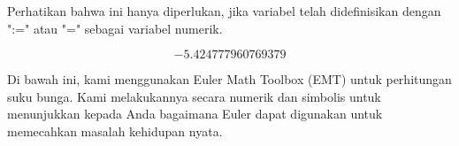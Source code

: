 \documentclass[a4paper,10pt]{article}
\begin{document}
\begin{eulernotebook}
\begin{eulercomment}
\begin{eulercomment}
\begin{eulercomment}
\begin{eulercomment}
\begin{eulercomment}
\begin{eulercomment}
\begin{eulercomment}
\begin{eulercomment}
\begin{eulercomment}
Perhatikan bahwa ini hanya diperlukan, jika variabel telah
didefinisikan dengan ":=" atau "=" sebagai variabel numerik.
\end{eulercomment}
\begin{eulerformula}
\[
-5.424777960769379
\]
\end{eulerformula}
\begin{eulercomment}
\begin{eulercomment}
\begin{eulercomment}
Di bawah ini, kami menggunakan Euler Math Toolbox (EMT) untuk
perhitungan suku bunga. Kami melakukannya secara numerik dan simbolis
untuk menunjukkan kepada Anda bagaimana Euler dapat digunakan untuk
memecahkan masalah kehidupan nyata.


\end{eulercomment}
\end{eulercomment}
\end{eulercomment}
\end{eulercomment}
\end{eulercomment}
\end{eulercomment}
\end{eulercomment}
\end{eulercomment}
\end{eulercomment}
\end{eulercomment}
\end{eulercomment}
\end{eulernotebook}
\end{document}
